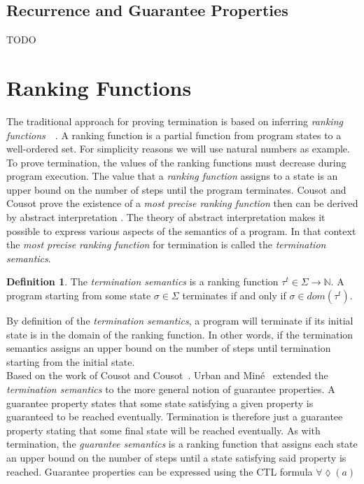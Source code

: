 \documentclass[11pt,a4paper,titlepage]{article}
\theoremstyle{definition}
\newtheorem{definition}{Definition}[section]
\begin{document}
\subsection{Recurrence and Guarantee Properties}
TODO


\section{Ranking Functions}\label{sec:ranking_functions}

The traditional approach for proving termination is based on inferring \textit{ranking functions}~\cite{Touring49}~\cite{Floyd67}.
A ranking function is a partial function from program states to a well-ordered set. For simplicity reasons we will use natural numbers as example.
To prove termination, the values of the ranking functions must decrease during program execution. 
The value that a \textit{ranking function} assigns to a state is an upper bound on the number of steps until the program terminates.
Cousot and Cousot prove the existence of a \textit{most precise ranking function} then can be derived 
by abstract interpretation \cite{CousotCousot-POPL12}. The theory of abstract interpretation makes it possible to express 
various aspects of the semantics of a program. In that context the \textit{most precise ranking function} for termination is called
the \textit{termination semantics}.

\begin{definition}
    The \textit{termination semantics} is a ranking function 
    $\tau^{t} \in \Sigma \rightarrow \mathbb{N}$.
    A program starting from some state $\sigma \in \Sigma$ terminates if and only if $\sigma \in dom(\tau^{t})$.
\end{definition}

By definition of the \textit{termination semantics}, a program will terminate if its initial state is in the domain of
the ranking function. In other words, if the termination semantics assigns an upper bound on the number of steps until termination
starting from the initial state.\\


Based on the work of Cousot and Cousot~\cite{CousotCousot-POPL12}. Urban and Miné~\cite{UrbanM-VMCAI15} extended the 
\textit{termination semantics} to the more general notion of guarantee properties. A guarantee property states that
some state satisfying a given property is guaranteed to be reached eventually. Termination is therefore just a 
guarantee property stating that some final state will be reached eventually. As with termination, 
the \textit{guarantee semantics} is a ranking function that assigns each state an upper bound on the number of steps
until a state satisfying said property is reached. Guarantee properties can be expressed using the CTL formula $\forall\lozenge(a)$
\end{document}
